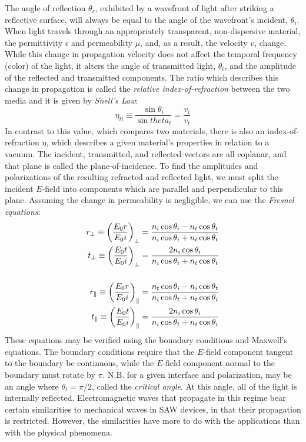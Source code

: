 \documentclass[a4paper,10pt]{report}
\numberwithin{equation}{section}
\begin{document}
The angle of reflection $\theta_r$, exhibited by a wavefront of light after striking a reflective surface, will always be equal to the angle of the wavefront's incident, $\theta_i$. When light travels through an appropriately transparent, non-dispersive material, the permittivity $\epsilon$ and permeability $\mu$, and, as a result, the velocity $v$, change. While this change in propagation velocity does not affect the temporal frequency (color) of the light, it alters the angle of transmitted light, $\theta_t$, and the amplitude of the reflected and transmitted components. The ratio which describes this change in propagation is called the \emph{relative index-of-refraction} between the two media and it is given by \emph{Snell's Law}\cite[p.97]{Hecht1987}:
\begin{equation}\label{snell_em}
\eta_{ti} \equiv \frac{\sin{\theta_i}}{\sin{theta_t}} = \frac{v_i}{v_t}
\end{equation}
In contrast to this value, which compares two materials, there is also an index-of-refraction $\eta$, which describes a given material's properties in relation to a vacuum. The incident, transmitted, and reflected vectors are all coplanar, and that plane is called the plane-of-incidence. To find the amplitudes and polarizations of the resulting refracted and reflected light, we must split the incident $E$-field into components which are parallel and perpendicular to this plane. Assuming the change in permeability is negligible, we can use the \emph{Fresnel equations}: \cite[p.~109]{Hecht1987}
\begin{align}\label{fresnel}
r_\perp \equiv \left( \frac{E_0r}{E_0i} \right)_\perp = \frac{n_i \cos{\theta_i} - n_t \cos{\theta_t}}{n_i \cos{\theta_i} + n_t \cos{\theta_t}}\notag\\
t_\perp \equiv \left( \frac{E_0t}{E_0i} \right)_\perp = \frac{2n_i \cos{\theta_i}}{n_i \cos{\theta_i} + n_t \cos{\theta_t}}\notag\\
{}\notag\\
r_\parallel \equiv \left( \frac{E_0r}{E_0i} \right)_\parallel = \frac{n_t \cos{\theta_i} - n_i \cos{\theta_t}}{n_i \cos{\theta_t} + n_t \cos{\theta_i}}\\
t_\parallel \equiv \left( \frac{E_0t}{E_0i} \right)_\parallel = \frac{2n_i \cos{\theta_i}}{n_i \cos{\theta_t} + n_t \cos{\theta_i}}\notag
\end{align}
These equations may be verified using the boundary conditions and Maxwell's equations. The boundary conditions require that the $E$-field component tangent to the boundary be continuous, while the $E$-field component normal to the boundary must rotate by $\pi$. N.B. for a given interface and polarization, may be an angle where $\theta_t = \pi / 2$, called the \emph{critical angle}. At this angle, all of the light is internally reflected. \cite[p.~112]{Hecht1987} Electromagnetic waves that propagate in this regime bear certain similarities to mechanical waves in SAW devices, in that their propagation is restricted. However, the similarities have more to do with the applications than with the physical phenomena. \cite[p.~440]{Kino1987}
\end{document}
